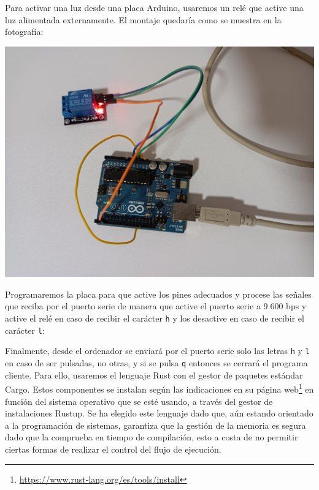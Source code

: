Para activar una luz desde una placa Arduino, usaremos un relé que active una
luz alimentada externamente. El montaje quedaría como se muestra en la
fotografía:

\includegraphics[width=\linewidth]{switch-light-wiring.jpg}

Programaremos la placa para que active los pines adecuados y procese las
señales que reciba por el puerto serie de manera que active el puerto serie a
9.600 bps y active el relé en caso de recibir el carácter \verb|h| y los
desactive en caso de recibir el carácter \verb|l|:



Finalmente, desde el ordenador se enviará por el puerto serie solo las letras
\verb|h| y \verb|l| en caso de ser pulsadas, no otras, y si se pulsa \verb|q|
entonces se cerrará el programa cliente. Para ello, usaremos el lenguaje Rust
con el gestor de paquetes estándar Cargo. Estos componentes se instalan según
las indicaciones en su página
web\footnote{\url{https://www.rust-lang.org/es/tools/install}} en función del
sistema operativo que se esté usando, a través del gestor de instalaciones
Rustup. Se ha elegido este lenguaje dado que, aún estando orientado a la
programación de sistemas, garantiza que la gestión de la memoria es segura dado
que la comprueba en tiempo de compilación, esto a costa de no permitir ciertas
formas de realizar el control del flujo de ejecución.

